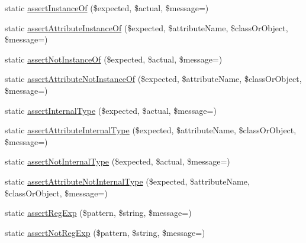 \begin{DoxyCompactItemize}
\item 
static \mbox{\hyperlink{class_p_h_p_unit___framework___assert_aac4c765a0684eb986a287dba2cf03c42}{assert\+Instance\+Of}} (\$expected, \$actual, \$message=\textquotesingle{}\textquotesingle{})
\item 
static \mbox{\hyperlink{class_p_h_p_unit___framework___assert_a7e465460ec00aad51e53ae5cfeaad6c4}{assert\+Attribute\+Instance\+Of}} (\$expected, \$attribute\+Name, \$class\+Or\+Object, \$message=\textquotesingle{}\textquotesingle{})
\item 
static \mbox{\hyperlink{class_p_h_p_unit___framework___assert_a1a0ba9059123e70b19e50b7f3ebdd7b3}{assert\+Not\+Instance\+Of}} (\$expected, \$actual, \$message=\textquotesingle{}\textquotesingle{})
\item 
static \mbox{\hyperlink{class_p_h_p_unit___framework___assert_adbe023d0a3be903a193b1cfe8e07904b}{assert\+Attribute\+Not\+Instance\+Of}} (\$expected, \$attribute\+Name, \$class\+Or\+Object, \$message=\textquotesingle{}\textquotesingle{})
\item 
static \mbox{\hyperlink{class_p_h_p_unit___framework___assert_a2546f106afa77b78240d4cdb669b4599}{assert\+Internal\+Type}} (\$expected, \$actual, \$message=\textquotesingle{}\textquotesingle{})
\item 
static \mbox{\hyperlink{class_p_h_p_unit___framework___assert_a0c1dfeba66d9d5329786a2d0d443a6a4}{assert\+Attribute\+Internal\+Type}} (\$expected, \$attribute\+Name, \$class\+Or\+Object, \$message=\textquotesingle{}\textquotesingle{})
\item 
static \mbox{\hyperlink{class_p_h_p_unit___framework___assert_ae15a8a5a2371edc2238cfcfd5af08ab8}{assert\+Not\+Internal\+Type}} (\$expected, \$actual, \$message=\textquotesingle{}\textquotesingle{})
\item 
static \mbox{\hyperlink{class_p_h_p_unit___framework___assert_afb4ca1cb16554777c8d0250f582e7b63}{assert\+Attribute\+Not\+Internal\+Type}} (\$expected, \$attribute\+Name, \$class\+Or\+Object, \$message=\textquotesingle{}\textquotesingle{})
\item 
static \mbox{\hyperlink{class_p_h_p_unit___framework___assert_a34c95aace2a87c54641d3ec36a912e79}{assert\+Reg\+Exp}} (\$pattern, \$string, \$message=\textquotesingle{}\textquotesingle{})
\item 
static \mbox{\hyperlink{class_p_h_p_unit___framework___assert_aa8aeb51e8cf8e6ec034a7f7fbf8e993d}{assert\+Not\+Reg\+Exp}} (\$pattern, \$string, \$message=\textquotesingle{}\textquotesingle{})
\item 

\end{DoxyCompactItemize}
